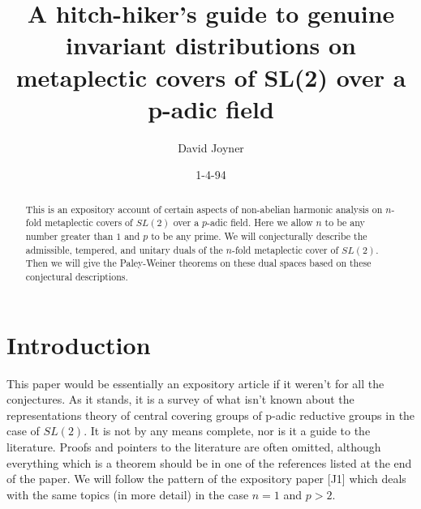 



\newtheorem{theorem}{Theorem}[section]
\newtheorem{corollary}[theorem]{Corollary}
\newtheorem{proposition}[theorem]{Proposition}
\newtheorem{example}[theorem]{Example}
\newtheorem{remark}[theorem]{Remark} %
\newtheorem{CA}[theorem]{Computer Algebra Commands} %
\newtheorem{definition}[theorem]{Definition} %
\newtheorem{lemma}[theorem]{Lemma}
\newtheorem{fact}[theorem]{Fact}
\newtheorem{conjecture}[theorem]{Conjecture}
\newtheorem{algorithm}[theorem]{Algorithm}
\newtheorem{axiom}[theorem]{Axiom}
\newtheorem{ponderable}[theorem]{Exercise}
\newtheorem{exercise}[theorem]{Exercise}
\newtheorem{solution}[theorem]{solution}

%


\author{David Joyner}
\title{A hitch-hiker's guide to genuine invariant distributions on metaplectic
covers of SL(2) over a p-adic field}
\date{1-4-94}
\maketitle

\begin{abstract}
This is an expository account of certain aspects of non-abelian harmonic
analysis on $n$-fold metaplectic covers of $SL(2)$ over a $p$-adic field.
Here we allow $n$ to be any number greater than $1$ and $p$ to be any prime.
We will conjecturally describe the admissible, tempered, and unitary duals
of the $n$-fold metaplectic cover of $SL(2)$. Then we will give the
Paley-Weiner theorems on these dual spaces based on these conjectural
descriptions.
\end{abstract}

\tableofcontents



\section{Introduction}

This paper would be essentially an expository article if it weren't for all
the conjectures. As it stands, it is a survey of what isn't known about the
representations theory of central covering groups of p-adic reductive groups
in the case of $SL(2)$. It is not by any means complete,
nor is it a guide to the literature. Proofs and
pointers to the literature are often omitted, although everything which is a
theorem should be in one of the references listed at the end of the paper.
We will follow the pattern of the expository paper [J1] which deals with the
same topics (in more detail) in the case $n=1$ and $p>2$.

